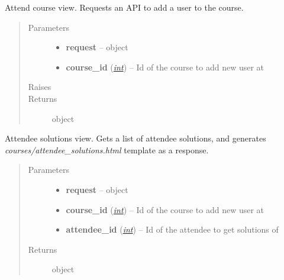 \documentclass[letterpaper,10pt,english]{sphinxmanual}
\begin{document}
\begin{fulllineitems}
\label{web_portal:core.courses.views.attend_course}
Attend course view. Requests an API to add a user to the course.
\begin{quote}\begin{description}
\item[{Parameters}] \leavevmode\begin{itemize}
\item {} 
\textbf{request} --  object

\item {} 
\textbf{course\_id} (\href{http://docs.python.org/library/functions.html\#int}{\emph{int}}) -- Id of the course to add new user at

\end{itemize}

\item[{Raises}] \leavevmode
{}

\item[{Returns}] \leavevmode
{} object

\end{description}\end{quote}

\end{fulllineitems}


\begin{fulllineitems}
\label{web_portal:core.courses.views.attendee_solutions}
Attendee solutions view. Gets a list of attendee solutions, and generates
\emph{courses/attendee\_solutions.html} template as a response.
\begin{quote}\begin{description}
\item[{Parameters}] \leavevmode\begin{itemize}
\item {} 
\textbf{request} --  object

\item {} 
\textbf{course\_id} (\href{http://docs.python.org/library/functions.html\#int}{\emph{int}}) -- Id of the course to add new user at

\item {} 
\textbf{attendee\_id} (\href{http://docs.python.org/library/functions.html\#int}{\emph{int}}) -- Id of the attendee to get solutions of

\end{itemize}

\item[{Returns}] \leavevmode
{} object

\end{description}\end{quote}

\end{fulllineitems}
\end{document}
